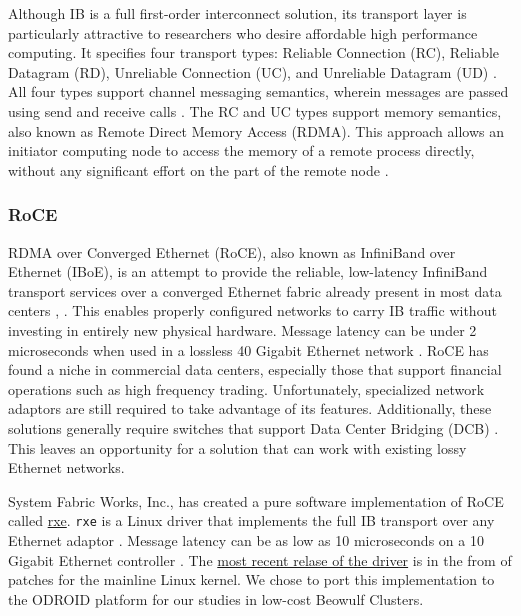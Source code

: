 \documentclass[11pt]{book}
\begin{document}
Although IB is a full first-order interconnect solution, its transport layer is
particularly attractive to researchers who desire affordable high performance
computing. It specifies four transport types: Reliable Connection (RC), Reliable
Datagram (RD), Unreliable Connection (UC), and Unreliable Datagram (UD)
\cite{InfiniBandTABase-07}. All four types support channel messaging semantics,
wherein messages are passed using send and receive calls
\cite{InfiniBandTABase-07}. The RC and UC types support memory semantics, also
known as Remote Direct Memory Access (RDMA). This approach allows an initiator
computing node to access the memory of a remote process directly, without any
significant effort on the part of the remote node \cite{sur-11}.

\subsubsection{\textbf{RoCE}}

RDMA over Converged Ethernet (RoCE), also known as InfiniBand over Ethernet
(IBoE), is an attempt to provide the reliable, low-latency InfiniBand transport
services over a converged Ethernet fabric already present in most data centers
\cite{InfiniBandTARoCE-10}, \cite{roce-announce}. This enables properly
configured networks to carry IB traffic without investing in entirely new
physical hardware. Message latency can be under 2 microseconds when used in a
lossless 40 Gigabit Ethernet network \cite{vienne-12}. RoCE has found a niche in
commercial data centers, especially those that support financial operations such
as high frequency trading. Unfortunately, specialized network adaptors are still
required to take advantage of its features. Additionally, these solutions
generally require switches that support Data Center Bridging (DCB)
\cite{InfiniBandTARoCE-10}. This leaves an opportunity for a solution that can
work with existing lossy Ethernet networks.

System Fabric Works, Inc., has created a pure software implementation of RoCE
called \href{http://www.systemfabricworks.com/downloads/roce}{rxe}. \verb;rxe;
is a Linux driver that implements the full IB transport over any Ethernet
adaptor \cite{pearson-10}. Message latency can be as low as 10
microseconds on a 10 Gigabit Ethernet controller \cite{pearson-10}. The
\href{http://support.systemfabricworks.com/downloads/rxe/}{most recent relase of
  the driver} is in the from of patches for the mainline Linux kernel. We chose
to port this implementation to the ODROID platform for our studies in low-cost
Beowulf Clusters.
\end{document}
